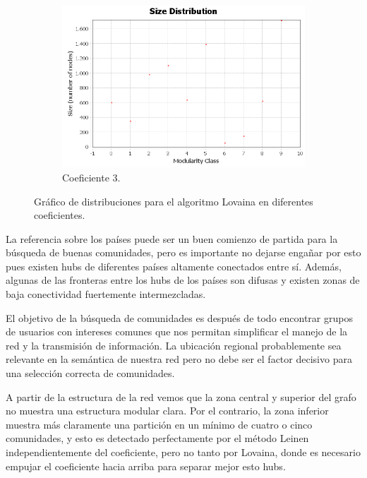 \begin{figure}
  \hfill
  \begin{subfigure}[t]{0.48\textwidth}
    \centering
    \includegraphics[width=\textwidth]{img/resultados/lovaina3/communities-size-distribution.png}
    \caption{Coeficiente 3.}
  \end{subfigure}

  \caption{Gráfico de distribuciones para el algoritmo Lovaina en diferentes coeficientes.}
\end{figure}

La referencia sobre los países puede ser un buen comienzo de partida para la búsqueda de buenas comunidades, pero es importante no dejarse engañar por esto pues existen hubs de diferentes países altamente conectados entre sí. Además, algunas de las fronteras entre los hubs de los países son difusas y existen zonas de baja conectividad fuertemente intermezcladas.

El objetivo de la búsqueda de comunidades es después de todo encontrar grupos de usuarios con intereses comunes que nos permitan simplificar el manejo de la red y la transmisión de información. La ubicación regional probablemente sea relevante en la semántica de nuestra red pero no debe ser el factor decisivo para una selección correcta de comunidades.

\vspace{\baselineskip}

A partir de la estructura de la red vemos que la zona central y superior del grafo no muestra una estructura modular clara. Por el contrario, la zona inferior muestra más claramente una partición en un mínimo de cuatro o cinco comunidades, y esto es detectado perfectamente por el método Leinen independientemente del coeficiente, pero no tanto por Lovaina, donde es necesario empujar el coeficiente hacia arriba para separar mejor esto hubs.


